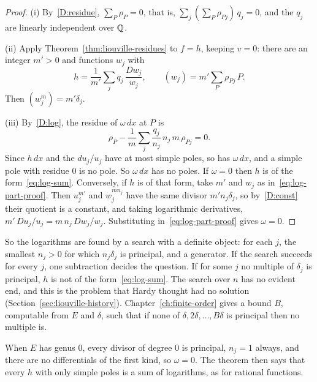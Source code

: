 \begin{proof}
(i) By~\ref{D:residue}, $\sum_P \rho_P = 0$, that is, $\sum_j (\sum_P
\rho_{Pj})\, q_j = 0$, and the $q_j$ are linearly independent over $\mathbb{Q}$.

(ii) Apply Theorem~\ref{thm:liouville-residues} to $f = h$, keeping $v = 0$:
there are an integer $m' > 0$ and functions $w_j$ with
\begin{equation}\label{eq:log-part-proof}
  h = \frac{1}{m'} \sum_j q_j\, \frac{Dw_j}{w_j},
  \qquad (w_j) = m' \sum_P \rho_{Pj}\, P .
\end{equation}
Then $(w_j^m) = m' \delta_j$.

(iii) By~\ref{D:log}, the residue of $\omega\,dx$ at $P$ is
\[
  \rho_P - \frac{1}{m} \sum_j \frac{q_j}{n_j}\, n_j\, m\, \rho_{Pj} = 0 .
\]
Since $h\,dx$ and the $du_j/u_j$ have at most simple poles, so has
$\omega\,dx$, and a simple pole with residue $0$ is no pole. So $\omega\,dx$
has no poles. If $\omega = 0$ then $h$ is of the form~\eqref{eq:log-sum}.
Conversely, if $h$ is of that form, take $m'$ and $w_j$ as
in~\eqref{eq:log-part-proof}. Then $u_j^{m'}$ and $w_j^{m n_j}$ have the same
divisor $m' n_j \delta_j$, so by~\ref{D:const} their quotient is a constant,
and taking logarithmic derivatives, $m'\, Du_j / u_j = m\, n_j\, Dw_j / w_j$.
Substituting in~\eqref{eq:log-part-proof} gives $\omega = 0$.
\end{proof}

So the logarithms are found by a search with a definite object: for each
$j$, the smallest $n_j > 0$ for which $n_j \delta_j$ is principal, and a
generator. If the search succeeds for every $j$, one subtraction decides the
question. If for some $j$ no multiple of $\delta_j$ is principal, $h$ is
not of the form~\eqref{eq:log-sum}. The search over $n$ has no evident end,
and this is the problem that Hardy thought had no solution
(Section~\ref{sec:liouville-history}). Chapter~\ref{ch:finite-order} gives a
bound $B$, computable from $E$ and $\delta$, such that if none of $\delta,
2\delta, \dots, B\delta$ is principal then no multiple is.

When $E$ has genus $0$, every divisor of degree $0$ is principal, $n_j = 1$
always, and there are no differentials of the first kind, so $\omega = 0$.
The theorem then says that every $h$ with only simple poles is a sum of
logarithms, as for rational functions.

